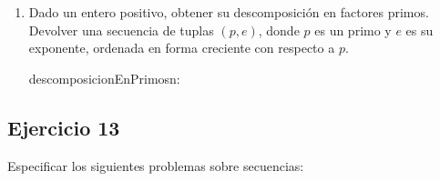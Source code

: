 \begin{enumerate}[label=\alph*]
      \item Dado un entero positivo, obtener su descomposición en factores primos. Devolver una secuencia de tuplas $(p, e)$, donde $p$ es un primo y $e$ es su exponente, ordenada en forma creciente con respecto a $p$.

            \begin{proc}{descomposicionEnPrimos}{\In n: \ent}{\TLista{\ent \times \nat}}


            \end{proc}
\end{enumerate}

\subsection{Ejercicio 13}
Especificar los siguientes problemas sobre secuencias:

